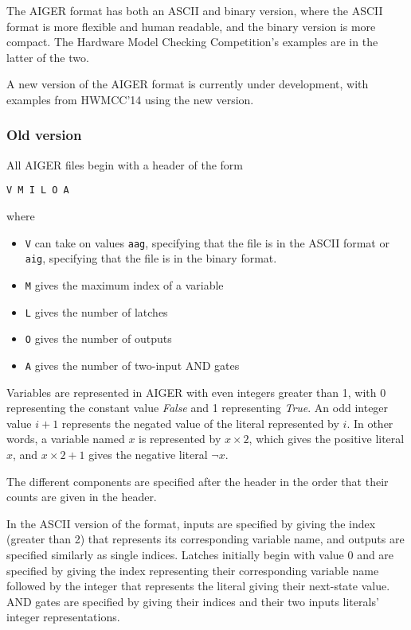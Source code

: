 \documentclass[12pt,a4paper,twoside,openright]{report}
\begin{document}
The AIGER format has both an ASCII and binary version, where the ASCII
format is more flexible and human readable, and the binary version is
more compact. The Hardware Model Checking Competition's examples
are in the latter of the two.

A new version of the AIGER format is currently under development, with
examples from HWMCC'14 using the new version.

\subsubsection{Old version}

All AIGER files begin with a header of the form
\begin{verbatim}
V M I L O A
\end{verbatim}
where
\begin{itemize}
\item \verb,V, can take on values \verb,aag,, specifying that the file is in the ASCII format or \verb,aig,,
specifying that the file is in the binary format.
\item \verb,M, gives the maximum index of a variable
\item \verb,L, gives the number of latches
\item \verb,O, gives the number of outputs
\item \verb,A, gives the number of two-input AND gates
\end{itemize}

Variables are represented in AIGER with even integers greater than
1, with 0 representing the constant value {\it False} and 1
representing {\it True}.
An odd integer value $i + 1$ represents the negated value of the literal
represented by $i$.
In other words, a variable named $x$ is represented by $x \times 2$,
which gives the positive literal $x$, and $x \times 2 + 1$ gives the
negative literal $\neg x$.

The different components are specified after the header
in the order that their counts are given in the header.

In the ASCII version of the format, inputs are specified by giving the
index (greater than 2) that represents its corresponding variable name,
and outputs are specified similarly as single indices.
Latches initially begin with value 0 and are specified by giving the
index representing
their corresponding variable name followed by the integer that represents
the literal giving their next-state value.
AND gates are specified by giving their indices and their two inputs
literals' integer representations.
\end{document}

